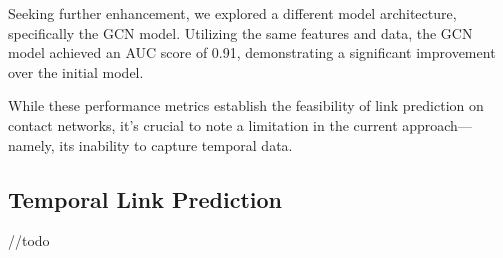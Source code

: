 \documentclass[times, 10pt,twocolumn]{article}
\begin{document}
Seeking further enhancement, we explored a different model architecture, specifically the GCN model. Utilizing the same features and data, the GCN model achieved an AUC score of 0.91, demonstrating a significant improvement over the initial model.


While these performance metrics establish the feasibility of link prediction on contact networks, it's crucial to note a limitation in the current approach—namely, its inability to capture temporal data. 

\subsection{Temporal Link Prediction}
//todo


\end{document}
